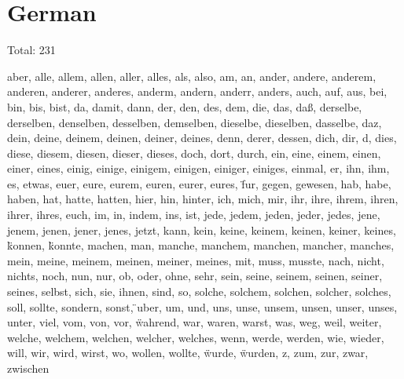 \section{German}

Total: 231

aber, alle, allem, allen, aller, alles, als, also, am, an, ander, andere, anderem, anderen, anderer, anderes, anderm, andern, anderr, anders, auch, auf, aus, bei, bin, bis, bist, da, damit, dann, der, den, des, dem, die, das, da{\ss}, derselbe, derselben, denselben, desselben, demselben, dieselbe, dieselben, dasselbe, daz, dein, deine, deinem, deinen, deiner, deines, denn, derer, dessen, dich, dir, d, dies, diese, diesem, diesen, dieser, dieses, doch, dort, durch, ein, eine, einem, einen, einer, eines, einig, einige, einigem, einigen, einiger, einiges, einmal, er, ihn, ihm, es, etwas, euer, eure, eurem, euren, eurer, eures, f{\"}ur, gegen, gewesen, hab, habe, haben, hat, hatte, hatten, hier, hin, hinter, ich, mich, mir, ihr, ihre, ihrem, ihren, ihrer, ihres, euch, im, in, indem, ins, ist, jede, jedem, jeden, jeder, jedes, jene, jenem, jenen, jener, jenes, jetzt, kann, kein, keine, keinem, keinen, keiner, keines, k{\"}onnen, k{\"}onnte, machen, man, manche, manchem, manchen, mancher, manches, mein, meine, meinem, meinen, meiner, meines, mit, muss, musste, nach, nicht, nichts, noch, nun, nur, ob, oder, ohne, sehr, sein, seine, seinem, seinen, seiner, seines, selbst, sich, sie, ihnen, sind, so, solche, solchem, solchen, solcher, solches, soll, sollte, sondern, sonst, {\"}uber, um, und, uns, unse, unsem, unsen, unser, unses, unter, viel, vom, von, vor, w{\"}ahrend, war, waren, warst, was, weg, weil, weiter, welche, welchem, welchen, welcher, welches, wenn, werde, werden, wie, wieder, will, wir, wird, wirst, wo, wollen, wollte, w{\"}urde, w{\"}urden, z, zum, zur, zwar, zwischen